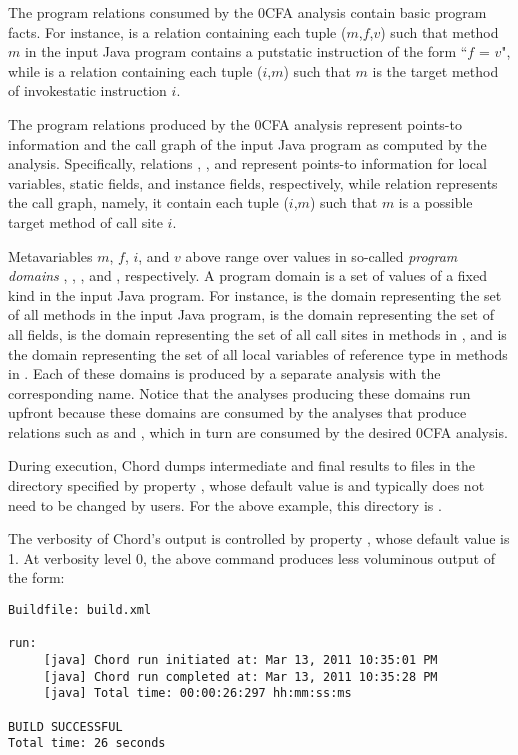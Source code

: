 The program relations consumed by the 0CFA analysis contain basic program facts.
For instance,  is a relation containing each tuple
($m$,$f$,$v$) such that method $m$ in the input Java program contains a
putstatic instruction of the form ``$f$ = $v$", while  is a
relation containing each tuple ($i$,$m$) such that $m$ is the target method of
invokestatic instruction $i$.

The program relations produced by the 0CFA analysis represent points-to
information and the call graph of the input Java program as computed by the
analysis.  Specifically, relations , , and 
represent points-to information for local variables, static fields, and instance
fields, respectively, while relation  represents the call graph,
namely, it contain each tuple ($i$,$m$) such that $m$ is a possible target
method of call site $i$.

Metavariables $m$, $f$, $i$, and $v$ above range over values in so-called
{\it program domains} , , , and , respectively.
A program domain is a set of values of a fixed kind in the input Java
program.  For instance,  is the domain representing the set of all
methods in the input Java program,  is the domain representing the set
of all fields,  is the domain representing the set of all call sites in
methods in , and  is the domain representing the set of all
local variables of reference type in methods in .  Each of these domains
is produced by a separate analysis with the corresponding name.  Notice
that the analyses producing these domains run upfront because these domains are
consumed by the analyses that produce relations such as 
and , which in turn are consumed by the desired 0CFA analysis.

During execution, Chord dumps intermediate and final results to files in the
directory specified by property , whose default value is
 and typically does not need to be changed
by users.  For the above example, this directory is
.

The verbosity of Chord's output is controlled by property
, whose default value is 1.  At verbosity level 0, the above
command produces less voluminous output of the form:

\begin{framed}
{\small
\begin{verbatim}
Buildfile: build.xml

run:
     [java] Chord run initiated at: Mar 13, 2011 10:35:01 PM
     [java] Chord run completed at: Mar 13, 2011 10:35:28 PM
     [java] Total time: 00:00:26:297 hh:mm:ss:ms

BUILD SUCCESSFUL
Total time: 26 seconds
\end{verbatim}
}
\end{framed}


